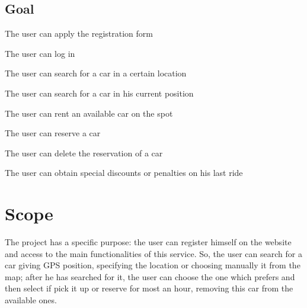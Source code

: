 \documentclass[11pt,a4paper]{report}
\begin{document}
\subsection{Goal}
\begin{Goal}
\item The user can apply the registration form
\item The user can log in
\item The user can search for a car in a certain location
\item The user can search for a car in his current position
\item The user can rent an available car on the spot
\item The user can reserve a car
\item The user can delete the reservation of a car
\item The user can obtain special discounts or penalties on his last ride
\end{Goal}

\section{Scope}
The project has a specific purpose: the user can register himself on the website and access to the main functionalities of this service.
So, the user can search for a car giving GPS position, specifying the location or choosing manually it from the map; after he has searched for it, the user can choose the one which prefers and then select if pick it up or reserve for most an hour, removing this car from the available ones.
\end{document}
